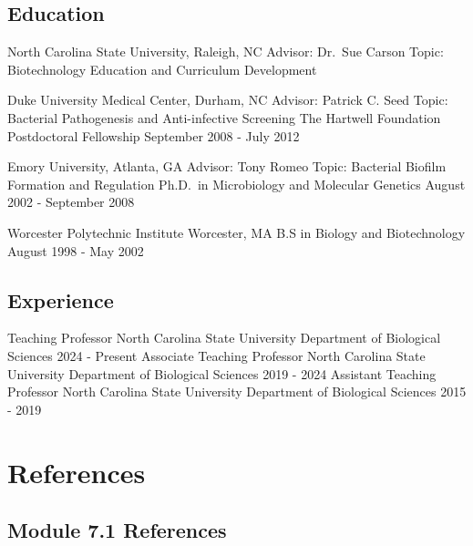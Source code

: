 \documentclass[
  letterpaper,
  DIV=11,
  numbers=noendperiod]{scrreprt}
\begin{document}
\section{Education}\label{education}

North Carolina State University, Raleigh, NC \textbar{} Advisor: Dr.~Sue
Carson \textbar{} Topic: Biotechnology Education and Curriculum
Development

Duke University Medical Center, Durham, NC \textbar{} Advisor: Patrick
C. Seed \textbar{} Topic: Bacterial Pathogenesis and Anti-infective
Screening The Hartwell Foundation Postdoctoral Fellowship \textbar{}
September 2008 - July 2012

Emory University, Atlanta, GA \textbar{} Advisor: Tony Romeo \textbar{}
Topic: Bacterial Biofilm Formation and Regulation Ph.D.~in Microbiology
and Molecular Genetics \textbar{} August 2002 - September 2008

Worcester Polytechnic Institute \textbar{} Worcester, MA B.S in Biology
and Biotechnology \textbar{} August 1998 - May 2002

\section{Experience}\label{experience}

Teaching Professor \textbar{} North Carolina State University Department
of Biological Sciences \textbar{} 2024 - Present Associate Teaching
Professor \textbar{} North Carolina State University Department of
Biological Sciences \textbar{} 2019 - 2024 Assistant Teaching Professor
\textbar{} North Carolina State University Department of Biological
Sciences \textbar{} 2015 - 2019


\chapter*{References}\label{references-2}


\section*{Module 7.1 References}\label{module-7.1-references}

\end{document}
